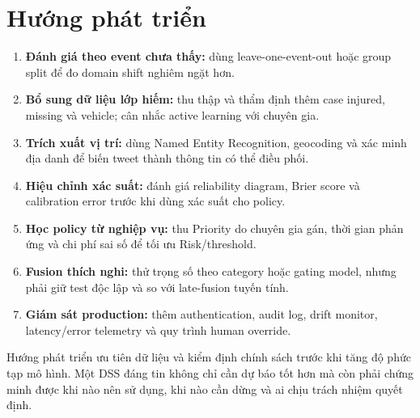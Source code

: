 \section{Hướng phát triển}

\begin{enumerate}[leftmargin=*]
  \item \textbf{Đánh giá theo event chưa thấy:} dùng leave-one-event-out hoặc
        group split để đo domain shift nghiêm ngặt hơn.
  \item \textbf{Bổ sung dữ liệu lớp hiếm:} thu thập và thẩm định thêm case
        injured, missing và vehicle; cân nhắc active learning với chuyên gia.
  \item \textbf{Trích xuất vị trí:} dùng Named Entity Recognition, geocoding và
        xác minh địa danh để biến tweet thành thông tin có thể điều phối.
  \item \textbf{Hiệu chỉnh xác suất:} đánh giá reliability diagram, Brier score
        và calibration error trước khi dùng xác suất cho policy.
  \item \textbf{Học policy từ nghiệp vụ:} thu Priority do chuyên gia gán, thời
        gian phản ứng và chi phí sai số để tối ưu Risk/threshold.
  \item \textbf{Fusion thích nghi:} thử trọng số theo category hoặc gating model,
        nhưng phải giữ test độc lập và so với late-fusion tuyến tính.
  \item \textbf{Giám sát production:} thêm authentication, audit log, drift
        monitor, latency/error telemetry và quy trình human override.
\end{enumerate}

Hướng phát triển ưu tiên dữ liệu và kiểm định chính sách trước khi tăng độ phức
tạp mô hình. Một DSS đáng tin không chỉ cần dự báo tốt hơn mà còn phải chứng minh
được khi nào nên sử dụng, khi nào cần dừng và ai chịu trách nhiệm quyết định.
